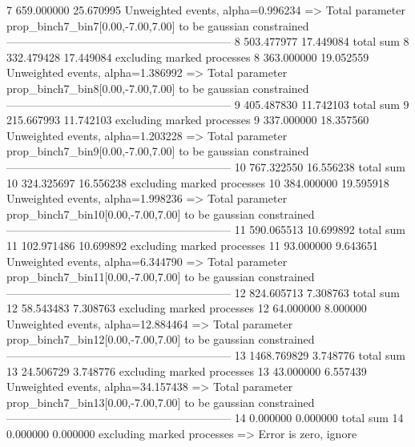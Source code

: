 7          659.000000      25.670995       Unweighted events, alpha=0.996234
  => Total parameter prop_binch7_bin7[0.00,-7.00,7.00] to be gaussian constrained
------------------------------------------------------------
8          503.477977      17.449084       total sum                     
8          332.479428      17.449084       excluding marked processes    
8          363.000000      19.052559       Unweighted events, alpha=1.386992
  => Total parameter prop_binch7_bin8[0.00,-7.00,7.00] to be gaussian constrained
------------------------------------------------------------
9          405.487830      11.742103       total sum                     
9          215.667993      11.742103       excluding marked processes    
9          337.000000      18.357560       Unweighted events, alpha=1.203228
  => Total parameter prop_binch7_bin9[0.00,-7.00,7.00] to be gaussian constrained
------------------------------------------------------------
10         767.322550      16.556238       total sum                     
10         324.325697      16.556238       excluding marked processes    
10         384.000000      19.595918       Unweighted events, alpha=1.998236
  => Total parameter prop_binch7_bin10[0.00,-7.00,7.00] to be gaussian constrained
------------------------------------------------------------
11         590.065513      10.699892       total sum                     
11         102.971486      10.699892       excluding marked processes    
11         93.000000       9.643651        Unweighted events, alpha=6.344790
  => Total parameter prop_binch7_bin11[0.00,-7.00,7.00] to be gaussian constrained
------------------------------------------------------------
12         824.605713      7.308763        total sum                     
12         58.543483       7.308763        excluding marked processes    
12         64.000000       8.000000        Unweighted events, alpha=12.884464
  => Total parameter prop_binch7_bin12[0.00,-7.00,7.00] to be gaussian constrained
------------------------------------------------------------
13         1468.769829     3.748776        total sum                     
13         24.506729       3.748776        excluding marked processes    
13         43.000000       6.557439        Unweighted events, alpha=34.157438
  => Total parameter prop_binch7_bin13[0.00,-7.00,7.00] to be gaussian constrained
------------------------------------------------------------
14         0.000000        0.000000        total sum                     
14         0.000000        0.000000        excluding marked processes    
  => Error is zero, ignore      
